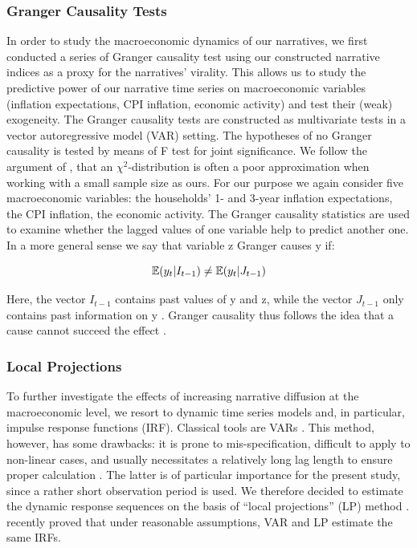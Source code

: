 \subsubsection{Granger Causality Tests}

In order to study the macroeconomic dynamics of our narratives, we first conducted a series of Granger causality test using our constructed narrative indices as a proxy for the narratives' virality. This allows us to study the predictive power of our narrative time series on macroeconomic variables (inflation expectations, CPI inflation, economic activity) and test their (weak) exogeneity. The Granger causality tests are constructed as multivariate tests in a vector autoregressive model (VAR) setting. The hypotheses of no Granger causality is tested by means of F test for joint significance. We follow the argument of \cite{Luetkepohl.2005}, that an $\chi^2$-distribution is often a poor approximation when working with a small sample size as ours. For our purpose we again consider five macroeconomic variables: the households' 1- and 3-year inflation expectations, the CPI inflation, the economic activity. The Granger causality statistics are used to examine whether the lagged values of one variable help to predict another one. In a more general sense we say that variable z Granger causes y if:

\begin{equation}
	\operatorname*{\mathbb{E}}(y_t|I_{t-1}) \neq \operatorname*{\mathbb{E}}(y_t|J_{t-1})
\end{equation}

\noindent Here, the vector $I_{t-1}$ contains past values of y and z, while the vector $J_{t-1}$ only contains past information on y \citep{wooldridge.2013}. Granger causality thus follows the idea that a cause cannot succeed the effect \citep[41]{Luetkepohl.2005}. 

\subsubsection{Local Projections}

To further investigate the effects of increasing narrative diffusion at the macroeconomic level, we resort to dynamic time series models and, in particular, impulse response functions (IRF). Classical tools are VARs \citep{Sims.1980}. This method, however, has some drawbacks: it is prone to mis-specification, difficult to apply to non-linear cases, and usually necessitates a relatively long lag length to ensure proper calculation \citep[161]{Jorda.2005}. The latter is of particular importance for the present study, since a rather short observation period is used. We therefore decided to estimate the dynamic response sequences on the basis of ``local projections'' (LP) method \citep{Jorda.2005}. \cite{Plagborg.2021} recently proved that under reasonable assumptions, VAR and LP estimate the same IRFs.

